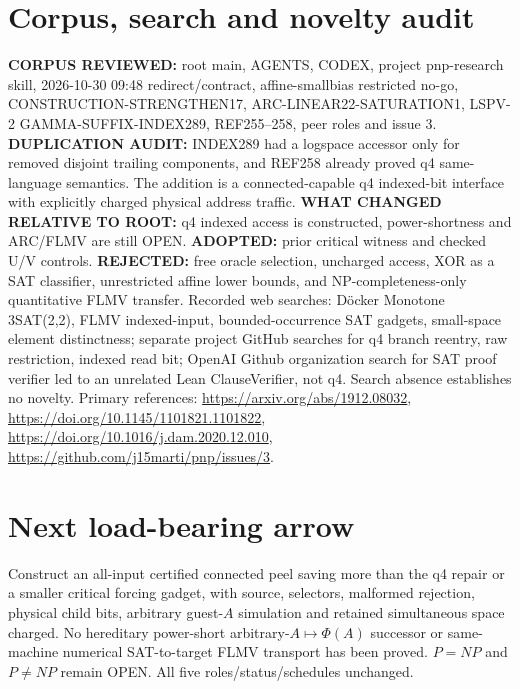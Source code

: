 \documentclass[11pt]{article}
\begin{document}
\section{Corpus, search and novelty audit}
\textbf{CORPUS REVIEWED:} root main, AGENTS, CODEX, project pnp-research skill, 2026-10-30 09:48 redirect/contract, affine-smallbias restricted no-go, CONSTRUCTION-STRENGTHEN17, ARC-LINEAR22-SATURATION1, LSPV-2 GAMMA-SUFFIX-INDEX289, REF255--258, peer roles and issue 3. \textbf{DUPLICATION AUDIT:} INDEX289 had a logspace accessor only for removed disjoint trailing components, and REF258 already proved q4 same-language semantics. The addition is a connected-capable q4 indexed-bit interface with explicitly charged physical address traffic. \textbf{WHAT CHANGED RELATIVE TO ROOT:} q4 indexed access is constructed, power-shortness and ARC/FLMV are still OPEN. \textbf{ADOPTED:} prior critical witness and checked U/V controls. \textbf{REJECTED:} free oracle selection, uncharged access, XOR as a SAT classifier, unrestricted affine lower bounds, and NP-completeness-only quantitative FLMV transfer.
Recorded web searches: D\"ocker Monotone 3SAT(2,2), FLMV indexed-input, bounded-occurrence SAT gadgets, small-space element distinctness; separate project GitHub searches for q4 branch reentry, raw restriction, indexed read bit; OpenAI Github organization search for SAT proof verifier led to an unrelated Lean ClauseVerifier, not q4. Search absence establishes no novelty.
Primary references: \url{https://arxiv.org/abs/1912.08032}, \url{https://doi.org/10.1145/1101821.1101822}, \url{https://doi.org/10.1016/j.dam.2020.12.010}, \url{https://github.com/j15marti/pnp/issues/3}.
\section{Next load-bearing arrow}
Construct an all-input certified connected peel saving more than the q4 repair or a smaller critical forcing gadget, with source, selectors, malformed rejection, physical child bits, arbitrary guest-$A$ simulation and retained simultaneous space charged. No hereditary power-short arbitrary-$A\mapsto\Phi(A)$ successor or same-machine numerical SAT-to-target FLMV transport has been proved. $P=NP$ and $P\ne NP$ remain OPEN. All five roles/status/schedules unchanged.
\end{document}
